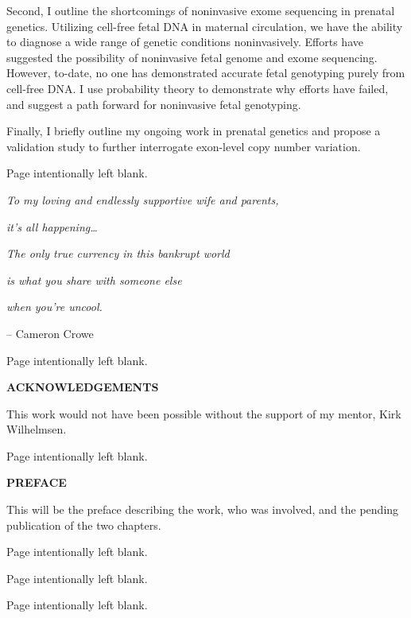 \documentclass[11pt,letterpaper]{book}
\makeatletter
\newcommand*{\blankpage}{%
\vspace*{\fill}
{\centering Page intentionally left blank. \par}
\vspace{\fill}}
\renewcommand*{\cleardoublepage}{\clearpage\if@twoside \ifodd\c@page\else
\blankpage
\thispagestyle{empty}
\newpage
\if@twocolumn\hbox{}\newpage\fi\fi\fi}
\newcommand{\mytwoin}[1]{
\vspace*{0.6875in}
\begin{center}
\bfseries\Large\MakeUppercase{#1}
\end{center}
}
\makeatother
\begin{document}
  Second, I outline the shortcomings of noninvasive exome sequencing in prenatal genetics.
  Utilizing cell-free fetal DNA in maternal circulation, we have the ability to diagnose a wide range of genetic conditions noninvasively.
  Efforts have suggested the possibility of noninvasive fetal genome and exome sequencing.
  However, to-date, no one has demonstrated accurate fetal genotyping purely from cell-free DNA.
  I use probability theory to demonstrate why efforts have failed, and suggest a path forward for noninvasive fetal genotyping.
  
  Finally, I briefly outline my ongoing work in prenatal genetics and propose a validation study to further interrogate exon-level copy number variation.

  \cleardoublepage
  \vspace*{0.75in}
  \begin{center}
    \emph{To my loving and endlessly supportive wife and parents,}
    
    \emph{it's all happening\ldots{}}
    
    \vspace{3in}
    \flushright
    
    \emph{The only true currency in this bankrupt world}
    
    \emph{is what you share with someone else}
    
    \emph{when you're uncool.}
    
    -- Cameron Crowe
  \end{center}

  \cleardoublepage
  \mytwoin{Acknowledgements}
  This work would not have been possible without the support of my mentor, Kirk Wilhelmsen.

  \cleardoublepage
  \mytwoin{Preface}
  This will be the preface describing the work, who was involved, and the pending publication of the two chapters.

\clearpage

\tableofcontents
\cleardoublepage

\listoffigures
{}
\cleardoublepage

{}
\listoftables
\cleardoublepage
\end{document}
